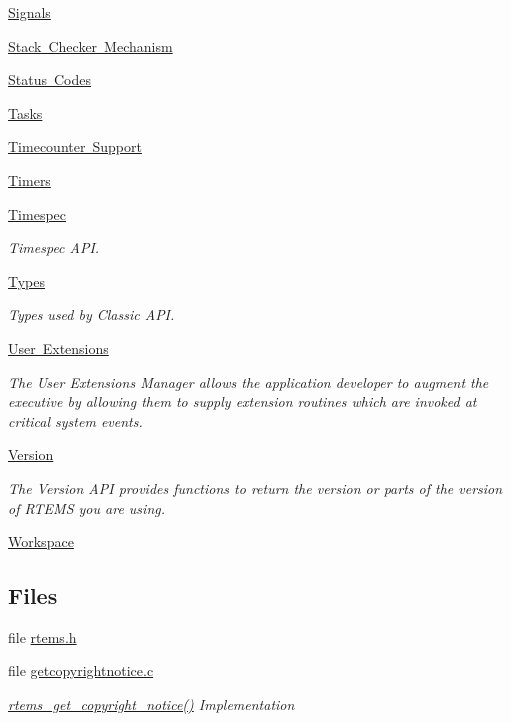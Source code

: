 \begin{DoxyCompactItemize}
\item 
\mbox{\hyperlink{group__ClassicSignal}{Signals}}
\item 
\mbox{\hyperlink{group__libmisc__stackchk}{Stack Checker Mechanism}}
\item 
\mbox{\hyperlink{group__ClassicStatus}{Status Codes}}
\item 
\mbox{\hyperlink{group__ClassicTasks}{Tasks}}
\item 
\mbox{\hyperlink{group__SAPITimecounter}{Timecounter Support}}
\item 
\mbox{\hyperlink{group__ClassicTimer}{Timers}}
\item 
\mbox{\hyperlink{group__TimespecAPI}{Timespec}}
\begin{DoxyCompactList}\small\item\em Timespec A\+PI. \end{DoxyCompactList}\item 
\mbox{\hyperlink{group__ClassicTypes}{Types}}
\begin{DoxyCompactList}\small\item\em Types used by Classic A\+PI. \end{DoxyCompactList}\item 
\mbox{\hyperlink{group__ClassicUserExtensions}{User Extensions}}
\begin{DoxyCompactList}\small\item\em The User Extensions Manager allows the application developer to augment the executive by allowing them to supply extension routines which are invoked at critical system events. \end{DoxyCompactList}\item 
\mbox{\hyperlink{group__RTEMSAPIClassicVersion}{Version}}
\begin{DoxyCompactList}\small\item\em The Version A\+PI provides functions to return the version or parts of the version of R\+T\+E\+MS you are using. \end{DoxyCompactList}\item 
\mbox{\hyperlink{group__ClassicRTEMSWorkspace}{Workspace}}
\end{DoxyCompactItemize}
\subsection*{Files}
\begin{DoxyCompactItemize}
\item 
file \mbox{\hyperlink{rtems_8h}{rtems.\+h}}
\item 
file \mbox{\hyperlink{getcopyrightnotice_8c}{getcopyrightnotice.\+c}}
\begin{DoxyCompactList}\small\item\em \mbox{\hyperlink{group__RTEMSAPIClassic_ga0d908223c4c681f71809858fc266af26}{rtems\+\_\+get\+\_\+copyright\+\_\+notice()}} Implementation \end{DoxyCompactList}\end{DoxyCompactItemize}

